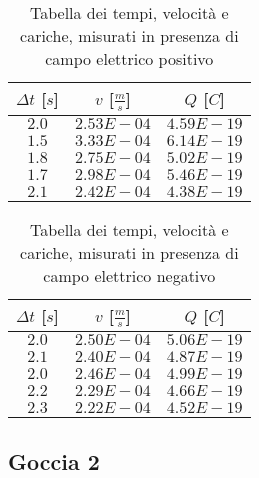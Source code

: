 \documentclass{article}
\begin{document}
\begin{multicols}{2}

\begin{table}[H]
	\centering
	\begin{tabular}{| c | c | c |}
		\hline
		$\Delta t$ [$s$] & $v$ [$\frac ms$] & $Q$ [$C$] \\
		\hline
		$2.0$ & $2.53E-04$ & $4.59E-19$ \\
		$1.5$ & $3.33E-04$ & $6.14E-19$ \\
		$1.8$ & $2.75E-04$ & $5.02E-19$ \\
		$1.7$ & $2.98E-04$ & $5.46E-19$ \\
		$2.1$ & $2.42E-04$ & $4.38E-19$ \\
		\hline
	\end{tabular}
	\caption{Tabella dei tempi, velocità e cariche, misurati in presenza di campo elettrico positivo}
	\label{}
\end{table}

\columnbreak

\begin{table}[H]
	\centering
	\begin{tabular}{| c | c | c |}
		\hline
		$\Delta t$ [$s$] & $v$ [$\frac ms$] & $Q$ [$C$] \\
		\hline
		$2.0$ & $2.50E-04$ & $5.06E-19$ \\
		$2.1$ & $2.40E-04$ & $4.87E-19$ \\
		$2.0$ & $2.46E-04$ & $4.99E-19$ \\
		$2.2$ & $2.29E-04$ & $4.66E-19$ \\
		$2.3$ & $2.22E-04$ & $4.52E-19$ \\
		\hline		
	\end{tabular}
	\caption{Tabella dei tempi, velocità e cariche, misurati in presenza di campo elettrico negativo}
	\label{}
\end{table}
	
\end{multicols}

\subsection{Goccia 2}
\end{document}

